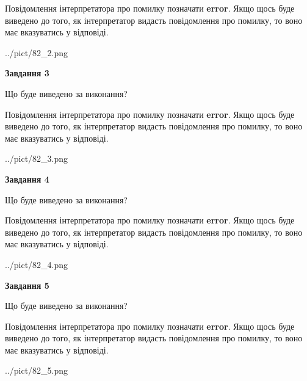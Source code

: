 \documentclass[12pt, ukrainian]{article}
\begin{document}
{\begin {large}
Повідомлення інтерпретатора про помилку позначати \textbf{error}.
Якщо щось буде виведено до того, як інтерпретатор видасть повідомлення про помилку, 
то воно має вказуватись у відповіді. \par


\begin{center}
	{../pict/82_2.png}
\end{center}
\newpage

{\begin {center}\textbf{Завдання 3}\end {center}}\par
Що буде виведено за виконання?

Повідомлення інтерпретатора про помилку позначати \textbf{error}.
Якщо щось буде виведено до того, як інтерпретатор видасть повідомлення про помилку, 
то воно має вказуватись у відповіді. \par


\begin{center}
	{../pict/82_3.png}
\end{center}
\newpage

{\begin {center}\textbf{Завдання 4}\end {center}}\par
Що буде виведено за виконання?

Повідомлення інтерпретатора про помилку позначати \textbf{error}.
Якщо щось буде виведено до того, як інтерпретатор видасть повідомлення про помилку, 
то воно має вказуватись у відповіді. \par


\begin{center}
	{../pict/82_4.png}
\end{center}
\newpage

{\begin {center}\textbf{Завдання 5}\end {center}}\par
Що буде виведено за виконання?

Повідомлення інтерпретатора про помилку позначати \textbf{error}.
Якщо щось буде виведено до того, як інтерпретатор видасть повідомлення про помилку, 
то воно має вказуватись у відповіді. \par


\begin{center}
	{../pict/82_5.png}
\end{center}
\newpage


\end{large}}
\end{document}
